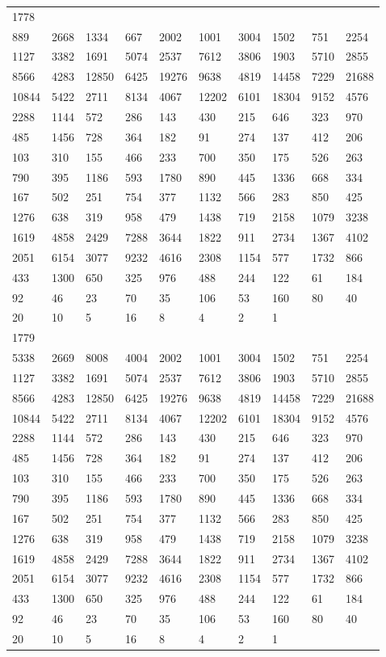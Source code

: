 \begin{longtable}{*{10}{l}}
1778&&&&&&&&&\\
889& 2668& 1334& 667& 2002& 1001& 3004& 1502& 751& 2254\\
1127& 3382& 1691& 5074& 2537& 7612& 3806& 1903& 5710& 2855\\
8566& 4283& 12850& 6425& 19276& 9638& 4819& 14458& 7229& 21688\\
10844& 5422& 2711& 8134& 4067& 12202& 6101& 18304& 9152& 4576\\
2288& 1144& 572& 286& 143& 430& 215& 646& 323& 970\\
485& 1456& 728& 364& 182& 91& 274& 137& 412& 206\\
103& 310& 155& 466& 233& 700& 350& 175& 526& 263\\
790& 395& 1186& 593& 1780& 890& 445& 1336& 668& 334\\
167& 502& 251& 754& 377& 1132& 566& 283& 850& 425\\
1276& 638& 319& 958& 479& 1438& 719& 2158& 1079& 3238\\
1619& 4858& 2429& 7288& 3644& 1822& 911& 2734& 1367& 4102\\
2051& 6154& 3077& 9232& 4616& 2308& 1154& 577& 1732& 866\\
433& 1300& 650& 325& 976& 488& 244& 122& 61& 184\\
92& 46& 23& 70& 35& 106& 53& 160& 80& 40\\
20& 10& 5& 16& 8& 4& 2& 1& \\

1779&&&&&&&&&\\
5338& 2669& 8008& 4004& 2002& 1001& 3004& 1502& 751& 2254\\
1127& 3382& 1691& 5074& 2537& 7612& 3806& 1903& 5710& 2855\\
8566& 4283& 12850& 6425& 19276& 9638& 4819& 14458& 7229& 21688\\
10844& 5422& 2711& 8134& 4067& 12202& 6101& 18304& 9152& 4576\\
2288& 1144& 572& 286& 143& 430& 215& 646& 323& 970\\
485& 1456& 728& 364& 182& 91& 274& 137& 412& 206\\
103& 310& 155& 466& 233& 700& 350& 175& 526& 263\\
790& 395& 1186& 593& 1780& 890& 445& 1336& 668& 334\\
167& 502& 251& 754& 377& 1132& 566& 283& 850& 425\\
1276& 638& 319& 958& 479& 1438& 719& 2158& 1079& 3238\\
1619& 4858& 2429& 7288& 3644& 1822& 911& 2734& 1367& 4102\\
2051& 6154& 3077& 9232& 4616& 2308& 1154& 577& 1732& 866\\
433& 1300& 650& 325& 976& 488& 244& 122& 61& 184\\
92& 46& 23& 70& 35& 106& 53& 160& 80& 40\\
20& 10& 5& 16& 8& 4& 2& 1& \\


\end{longtable}
